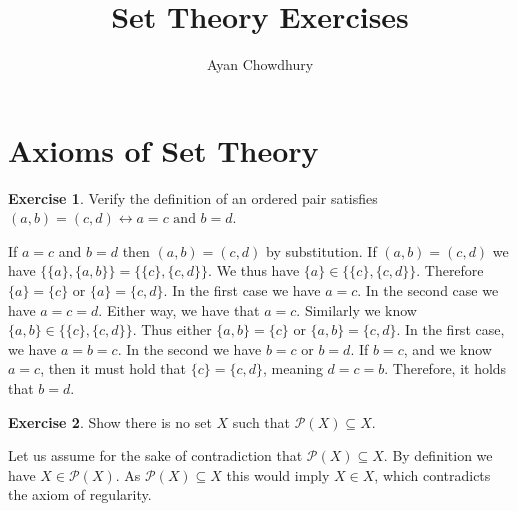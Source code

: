 \documentclass{article}
\title{Set Theory Exercises}
\author{Ayan Chowdhury}
\date{}
\theoremstyle{definition}
\newtheorem{exer}{Exercise}[section]
\newcommand{\powset}[1]{\mathcal{P}(#1)}
\newlength{\defparindent}
\newenvironment{answer}
    {\begin{mdframed}[backgroundcolor=gray!15, linewidth=0pt] \setlength{\parindent}{\defparindent}}
    {\end{mdframed}}
\begin{document}
\maketitle

\tableofcontents

\newpage

\section{Axioms of Set Theory}

\begin{exer}
    Verify the definition of an ordered pair satisfies $(a, b) = (c, d) \leftrightarrow a = c \text{ and } b = d$.
    \begin{answer}
        If $a = c$ and $b = d$ then $(a, b) = (c, d)$ by substitution. If $(a, b) = (c, d)$ we have $\{\{a\}, \{a, b\}\} = \{\{c\}, \{c, d\}\}$. We thus have $\{a\} \in \{\{c\}, \{c, d\}\}$. Therefore $\{a\} = \{c\}$ or $\{a\} = \{c, d\}$. In the first case we have $a = c$. In the second case we have $a = c = d$. Either way, we have that $a = c$. Similarly we know $\{a, b\} \in \{\{c\}, \{c, d\}\}$. Thus either $\{a, b\} = \{c\}$ or $\{a, b\} = \{c, d\}$. In the first case, we have $a = b = c$. In the second we have $b = c$ or $b = d$. If $b = c$, and we know $a = c$, then it must hold that $\{c\} = \{c, d\}$, meaning $d = c = b$. Therefore, it holds that $b = d$.
    \end{answer}
\end{exer}

\begin{exer}
    Show there is no set $X$ such that $\powset{X} \subseteq X$.

    \begin{answer}
        Let us assume for the sake of contradiction that $\powset{X} \subseteq X$. By definition we have $X \in \powset{X}$. As $\powset{X} \subseteq X$ this would imply $X \in X$, which contradicts the axiom of regularity.
    \end{answer}
\end{exer}
\end{document}

